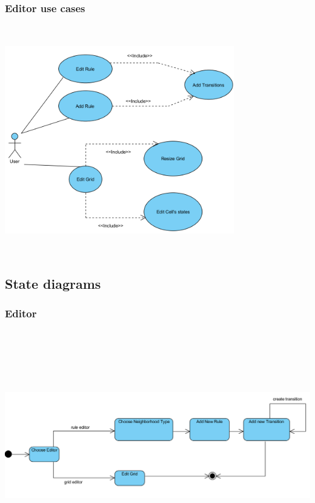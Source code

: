 \documentclass{article}
\begin{document}
	\subsubsection{Editor use cases}
		\hspace{-60pt}
		\includegraphics[width=100mm, height=100mm]{images/use_edit_d.png} \\	
				
				
	\subsection{State diagrams}


	\subsubsection{Editor}


		\hspace{-120pt}
		\includegraphics[width=200mm, height=100mm]{images/state_edit_d.png}
		
\end{document}
